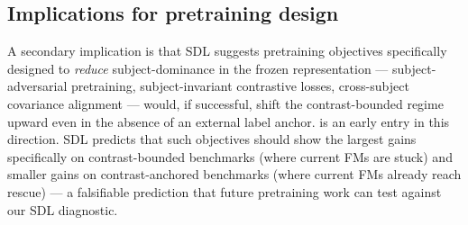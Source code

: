 \subsection{Implications for pretraining design}
A secondary implication is that SDL suggests pretraining objectives
specifically designed to \emph{reduce} subject-dominance in the
frozen representation --- subject-adversarial pretraining,
subject-invariant contrastive losses, cross-subject covariance
alignment --- would, if successful, shift the contrast-bounded
regime upward even in the absence of an external label anchor.
\citep{multidataset2025} is an early entry in this direction. SDL
predicts that such objectives should show the largest gains
specifically on contrast-bounded benchmarks (where current FMs are
stuck) and smaller gains on contrast-anchored benchmarks (where
current FMs already reach rescue) --- a falsifiable prediction that
future pretraining work can test against our SDL diagnostic.
